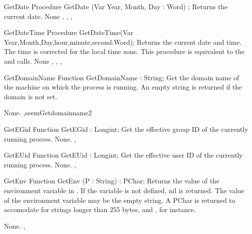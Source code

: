 
\begin{procedure}{GetDate}
\Declaration
Procedure GetDate  (Var Year, Month, Day : Word) ;
\Description
Returns the current date.
\Errors
None
\SeeAlso
{}, ,  ,  
\end{procedure}


\begin{procedure}{GetDateTime}
\Declaration
Procedure GetDateTime(Var Year,Month,Day,hour,minute,second:Word);
\Description
Returns the current date and time. The time is corrected for the local time
zone. This procedure is equivalent to the  and 
calls.
\Errors
None
\SeeAlso
{}, , ,  
\end{procedure}


\begin{function}{GetDomainName}
\Declaration
Function GetDomainName  : String;
\Description
Get the domain name of the machine on which the process is running.
An empty string is returned if the domain is not set.

\Errors
None.
\SeeAlso
 ,seem{Getdomainname}{2} 
\end{function}


\begin{function}{GetEGid}
\Declaration
Function GetEGid  : Longint;
\Description
 Get the effective group ID of the currently running process.
\Errors
None.
\SeeAlso
{},  
\end{function}


\begin{function}{GetEUid}
\Declaration
Function GetEUid  : Longint;
\Description
 Get the effective user ID of the currently running process.
\Errors
None.
\SeeAlso
{},  
\end{function}


\begin{function}{GetEnv}
\Declaration
Function GetEnv (P : String) : PChar;
\Description
Returns the value of the environment variable in . If the variable is
not defined, nil is returned. The value of the environment variable may be
the empty string.
A PChar is returned to accomodate for strings longer than 255 bytes,
 and , for instance.

\Errors
None.
\SeeAlso
{},  
\end{function}

